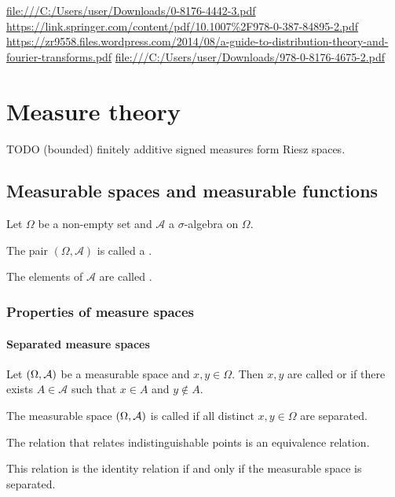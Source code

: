 \url{file:///C:/Users/user/Downloads/0-8176-4442-3.pdf}
\url{https://link.springer.com/content/pdf/10.1007%2F978-0-387-84895-2.pdf}
\url{https://zr9558.files.wordpress.com/2014/08/a-guide-to-distribution-theory-and-fourier-transforms.pdf}
\url{file:///C:/Users/user/Downloads/978-0-8176-4675-2.pdf}


\chapter{Measure theory}
TODO (bounded) finitely additive signed measures form Riesz spaces.

\section{Measurable spaces and measurable functions}
\begin{definition}
Let $\Omega$ be a non-empty set and $\mathcal{A}$ a $\sigma$-algebra on $\Omega$.

The pair $(\Omega, \mathcal{A})$ is called a .

The elements of $\mathcal{A}$ are called .
\end{definition}


\subsection{Properties of measure spaces}
\subsubsection{Separated measure spaces}
\begin{definition}
Let $\sSet{\Omega,\mathcal{A}}$ be a measurable space and $x,y\in \Omega$. Then $x,y$ are called  or  if there exists $A\in \mathcal{A}$ such that $x\in A$ and $y\notin A$.

The measurable space $\sSet{\Omega,\mathcal{A}}$ is called  if all distinct $x,y\in \Omega$ are separated.
\end{definition}

\begin{lemma}
The relation that relates indistinguishable points is an equivalence relation.

This relation is the identity relation \textup{if and only if} the measurable space is separated.
\end{lemma}

